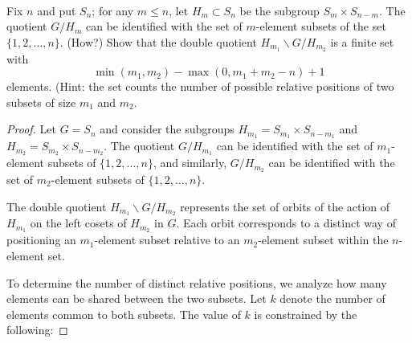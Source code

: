 \documentclass{article}
\begin{document}
\begin{problem} \\ 
    Fix $n$ and put $S_n$; for any $m \leq n$, let $H_m \subset S_n$ be the subgroup $S_m \times S_{n-m}$. %
    The quotient $G / H_m$ can be identified with the set of  $m$-element subsets of the set $\{1, 2, \ldots, n\}$. (How?) Show that the double quotient $H_{m_1} \backslash G / H_{m_2}$ is a finite set with 
    \[
        \min(m_1, m_2) - \max(0, m_1 + m_2 - n) + 1
    \]
    elements. (Hint: the set counts the number of possible relative positions of two subsets of size $m_1$ and $m_2$.%
\end{problem}


\begin{proof}
    Let $G = S_n$ and consider the subgroups $H_{m_1} = S_{m_1} \times S_{n-m_1}$ and $H_{m_2} = S_{m_2} \times S_{n-m_2}$. The quotient $G / H_{m_1}$ can be identified with the set of $m_1$-element subsets of $\{1, 2, \ldots, n\}$, and similarly, $G / H_{m_2}$ can be identified with the set of $m_2$-element subsets of $\{1, 2, \ldots, n\}$. 

    The double quotient $H_{m_1} \backslash G / H_{m_2}$ represents the set of orbits of the action of $H_{m_1}$ on the left cosets of $H_{m_2}$ in $G$. Each orbit corresponds to a distinct way of positioning an $m_1$-element subset relative to an $m_2$-element subset within the $n$-element set.

    To determine the number of distinct relative positions, we analyze how many elements can be shared between the two subsets. Let $k$ denote the number of elements common to both subsets. The value of $k$ is constrained by the following:

    

\end{proof}
\end{document}
